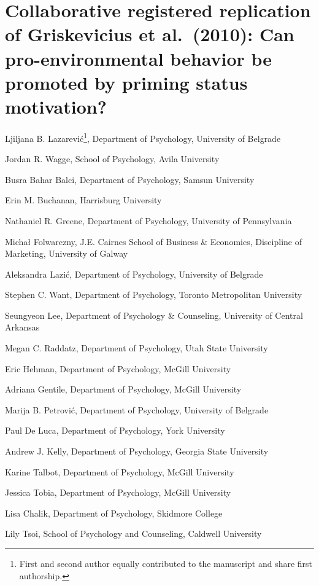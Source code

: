\documentclass[
]{article}
\author{}
\date{\vspace{-2.5em}}
\begin{document}
\section{Collaborative registered replication of Griskevicius et
al.~(2010): Can pro-environmental behavior be promoted by priming status
motivation?}\label{collaborative-registered-replication-of-griskevicius-et-al.-2010-can-pro-environmental-behavior-be-promoted-by-priming-status-motivation}

Ljiljana B. Lazarević\footnote{First and second author equally
  contributed to the manuscript and share first authorship.}, Department
of Psychology, University of Belgrade

Jordan R. Wagge, School of Psychology, Avila University

Busra Bahar Balci, Department of Psychology, Samsun University

Erin M. Buchanan, Harrisburg University

Nathaniel R. Greene, Department of Psychology, University of
Pennsylvania

Michał Folwarczny, J.E. Cairnes School of Business \& Economics,
Discipline of Marketing, University of Galway

Aleksandra Lazić, Department of Psychology, University of Belgrade

Stephen C. Want, Department of Psychology, Toronto Metropolitan
University

Seungyeon Lee, Department of Psychology \& Counseling, University of
Central Arkansas

Megan C. Raddatz, Department of Psychology, Utah State University

Eric Hehman, Department of Psychology, McGill University

Adriana Gentile, Department of Psychology, McGill University

Marija B. Petrović, Department of Psychology, University of Belgrade

Paul De Luca, Department of Psychology, York University

Andrew J. Kelly, Department of Psychology, Georgia State University

Karine Talbot, Department of Psychology, McGill University

Jessica Tobia, Department of Psychology, McGill University

Lisa Chalik, Department of Psychology, Skidmore College

Lily Tsoi, School of Psychology and Counseling, Caldwell University
\end{document}
